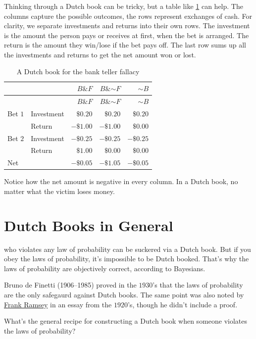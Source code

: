 \documentclass[justified]{tufte-book}
\renewcommand{\neg}{\mathbin{\sim}}
\renewcommand{\wedge}{\mathbin{\&}}
\theoremstyle{definition}
\theoremstyle{definition}
\theoremstyle{definition}
\theoremstyle{remark}
\begin{document}
Thinking through a Dutch book can be tricky, but a table like \ref{tab:banktellerdb} can help. The columns capture the possible outcomes, the rows represent exchanges of cash. For clarity, we separate investments and returns into their own rows. The investment is the amount the person pays or receives at first, when the bet is arranged. The return is the amount they win/lose if the bet pays off. The last row sums up all the investments and returns to get the net amount won or lost.

\begin{longtable}[]{@{}llrrr@{}}
\caption{\label{tab:banktellerdb}A Dutch book for the bank teller fallacy}\tabularnewline
\toprule
& & \(B \wedge F\) & \(B \wedge \neg F\) & \(\neg B\)\tabularnewline
\midrule
\endfirsthead
\toprule
& & \(B \wedge F\) & \(B \wedge \neg F\) & \(\neg B\)\tabularnewline
\midrule
\endhead
Bet \(1\) & Investment & \(\$0.20\) & \(\$0.20\) & \(\$0.20\)\tabularnewline
& Return & \(-\$1.00\) & \(-\$1.00\) & \(\$0.00\)\tabularnewline
Bet \(2\) & Investment & \(-\$0.25\) & \(-\$0.25\) & \(-\$0.25\)\tabularnewline
& Return & \(\$1.00\) & \(\$0.00\) & \(\$0.00\)\tabularnewline
Net & & \(-\$0.05\) & \(-\$1.05\) & \(-\$0.05\)\tabularnewline
\bottomrule
\end{longtable}

Notice how the net amount is negative in every column. In a Dutch book, no matter what the victim loses money.

\hypertarget{dutch-books-in-general}{%
\section{Dutch Books in General}\label{dutch-books-in-general}}

 who violates any law of probability can be suckered via a Dutch book. But if you obey the laws of probability, it's impossible to be Dutch booked. That's why the laws of probability are objectively correct, according to Bayesians.

\begin{marginfigure}
Bruno de Finetti (1906--1985) proved in the \(1930\)'s that the laws of
probability are the only safegaurd against Dutch books. The same point
was also noted by \protect\hyperlink{fig:ramsey}{Frank Ramsey} in an
essay from the \(1920\)'s, though he didn't include a proof.
\end{marginfigure}

What's the general recipe for constructing a Dutch book when someone violates the laws of probability?
\end{document}
